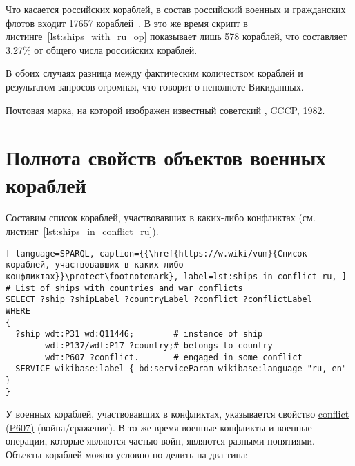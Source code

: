 Что касается российских кораблей, в состав российский военных и гражданских флотов входит \num{17657} кораблей~\cite{RussianShips}. В это же время скрипт в листинге~\ref{lst:ships_with_ru_op} показывает лишь 578 кораблей, что составляет 3.27\% от общего числа российских кораблей. 

В обоих случаях разница между фактическим количеством кораблей и результатом запросов огромная, что говорит о неполноте Викиданных.


\label{question:ship_2}

\begin{marginfigure}[0.0cm]
  {
    \setlength{\fboxsep}{0pt}%
    \setlength{\fboxrule}{1pt}%
  }
  \caption[Известный советский миноносец.]{Почтовая марка, на которой изображен известный советский  , CCCP, 1982.}%
  \label{fig:grem_question}%
\end{marginfigure}

\section{Полнота свойств объектов военных кораблей}

Составим список кораблей, участвовавших в каких-либо конфликтах (см. листинг~\ref{lst:ships_in_conflict_ru}).

\begin{lstlisting}[ language=SPARQL, caption={{\href{https://w.wiki/vum}{Список кораблей, участвовавших в каких-либо конфликтах}}\protect\footnotemark}, label=lst:ships_in_conflict_ru, ]
# List of ships with countries and war conflicts
SELECT ?ship ?shipLabel ?countryLabel ?conflict ?conflictLabel
WHERE
{
  ?ship wdt:P31 wd:Q11446;        # instance of ship
        wdt:P137/wdt:P17 ?country;# belongs to country
        wdt:P607 ?conflict.       # engaged in some conflict
  SERVICE wikibase:label { bd:serviceParam wikibase:language "ru, en" }
}
\end{lstlisting}

У военных кораблей, участвовавших в конфликтах, указывается свойство \href{https://www.wikidata.org/wiki/Property:P607}{conflict (P607)} (война/сражение). В то же время военные конфликты и военные операции, которые являются частью войн, являются разными понятиями. Объекты кораблей можно условно по делить на два типа:

